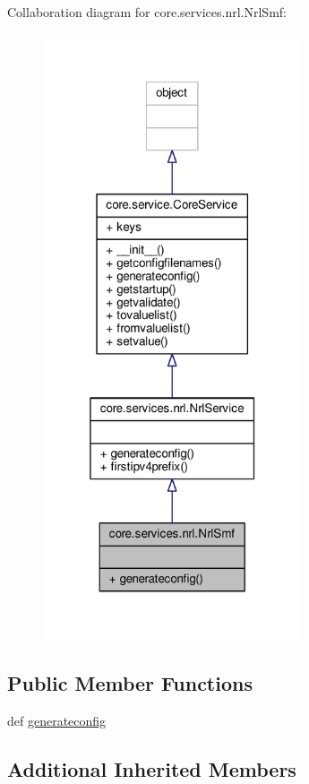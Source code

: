 Collaboration diagram for core.\+services.\+nrl.\+Nrl\+Smf\+:
\nopagebreak
\begin{figure}[H]
\begin{center}
\leavevmode
\includegraphics[width=217pt]{classcore_1_1services_1_1nrl_1_1_nrl_smf__coll__graph}
\end{center}
\end{figure}
\subsection*{Public Member Functions}
\begin{DoxyCompactItemize}
\item 
def \hyperlink{classcore_1_1services_1_1nrl_1_1_nrl_smf_a9a85dc7add4e81c656f502581a8c9ecd}{generateconfig}
\end{DoxyCompactItemize}
\subsection*{Additional Inherited Members}


